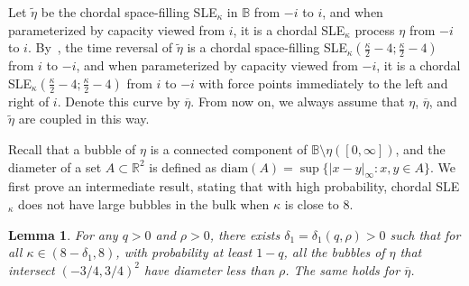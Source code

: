 \documentclass[a4paper]{article}
\numberwithin{equation}{section}
\newtheorem{lemma}[theorem]{Lemma}
\numberwithin{equation}{section}
\renewcommand{\1}{\mathbf{1}}
\begin{document}
Let $\widetilde \eta$ be the chordal space-filling SLE$_\kappa$ in $\mathbb B$ from $-i$ to $i$, and when parameterized by capacity viewed from $i$, it is a chordal SLE$_\kappa$ process $\eta$ from $-i$ to $i$. By~\cite[Theorem 1.19]{IG4}, the time reversal of $\widetilde \eta$ is a chordal space-filling SLE$_\kappa(\frac{\kappa}{2}-4;\frac{\kappa}{2}-4)$ from $i$ to $-i$, and when parameterized by capacity viewed from $-i$, it is a chordal SLE$_\kappa(\frac{\kappa}{2}-4;\frac{\kappa}{2}-4)$ from $i$ to $-i$ with force points immediately to the left and right of $i$. Denote this curve by $\overline \eta$. From now on, we always assume that $\eta$, $\overline \eta$, and $\widetilde \eta$ are coupled in this way.

Recall that a bubble of $\eta$ is a connected component of $\mathbb B \setminus \eta([0,\infty])$, and the diameter of a set $A \subset \mathbb R^2$ is defined as $\mathrm{diam}(A)=\sup\{|x-y|_\infty:x,y\in A\}$. We first prove an intermediate result, stating that with high probability, chordal SLE$_\kappa$ does not have large bubbles in the bulk when $\kappa$ is close to 8.

\begin{lemma}\label{lem:bubble-diameter}
    For any $q>0$ and $\rho>0$, there exists $\delta_1=\delta_1(q,\rho)>0$ such that for all $\kappa \in (8-\delta_1,8)$, with probability at least $1-q$, all the bubbles of $\eta$ that intersect $(-3/4,3/4)^2$ have diameter less than $\rho$. The same holds for $\overline\eta$.
\end{lemma}
\end{document}
